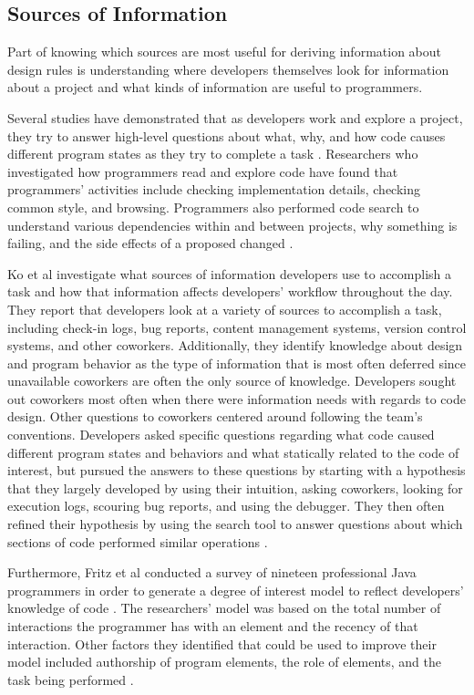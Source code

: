 \documentclass[12pt]{article}
\begin{document}
\subsection{Sources of Information} \label{infoSrcs}

	Part of knowing which sources are most useful for deriving information about design rules is understanding where developers themselves look for information about a project and what kinds of information are useful to programmers.  

Several studies have demonstrated that as developers work and explore a project, they try to answer high-level questions about what, why, and how code causes different program states as they try to complete a task \cite{SadowskiEtAl2015, LaTozaMyers2010, LaTozaEtAl2007}. Researchers who investigated how programmers read and explore code have found that programmers' activities include checking implementation details, checking common style, and browsing. Programmers also performed code search to understand various dependencies within and between projects, why something is failing, and the side effects of a proposed changed \cite{SadowskiEtAl2015}. 

Ko et al investigate what sources of information developers use to accomplish a task and how that information affects developers' workflow throughout the day. They report that developers look at a variety of sources to accomplish a task, including check-in logs, bug reports, content management systems, version control systems, and other coworkers. Additionally, they identify knowledge about design and program behavior as the type of information that is most often deferred since unavailable coworkers are often the only source of knowledge. Developers sought out coworkers most often when there were information needs with regards to code design. Other questions to coworkers centered around following the team's conventions. Developers asked specific questions regarding what code caused different program states and behaviors and what statically related to the code of interest, but pursued the answers to these questions by starting with a hypothesis that they largely developed by using their intuition, asking coworkers, looking for execution logs, scouring bug reports, and using the debugger. They then often refined their hypothesis by using the search tool to answer questions about which sections of code performed similar operations \cite{KoEtAl2007}. 

Furthermore, Fritz et al conducted a survey of nineteen professional Java programmers in order to generate a degree of interest model to reflect developers' knowledge of code \cite{FritzEtAl2007}. The researchers' model was based on the total number of interactions the programmer has with an element and the recency of that interaction. Other factors they identified that could be used to improve their model included authorship of program elements, the role of elements, and the task being performed \cite{FritzEtAl2007}.
\end{document}
